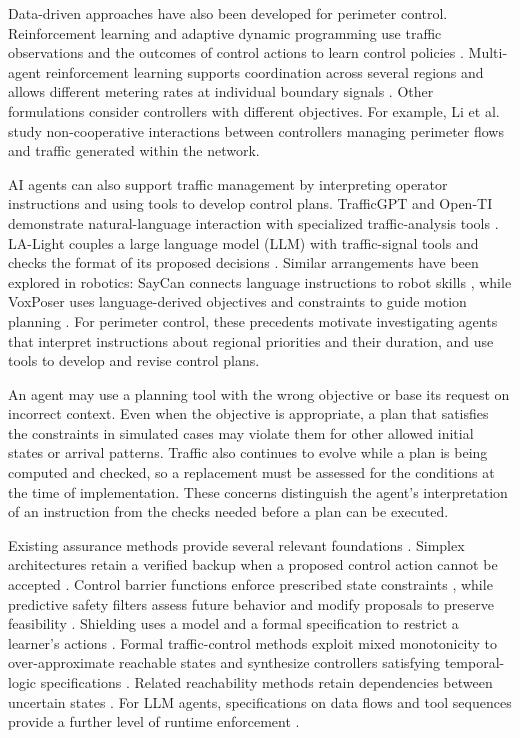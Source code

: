 \documentclass[preprint,12pt]{elsarticle}
\theoremstyle{definition}
\theoremstyle{plain}
\theoremstyle{definition}
\theoremstyle{plain}
\begin{document}
Data-driven approaches have also been developed for perimeter control.
Reinforcement learning and adaptive dynamic programming use traffic
observations and the outcomes of control actions to learn control policies
\cite{chen2022dataefficient,chen2024iadp}. Multi-agent reinforcement
learning supports coordination across several regions and allows
different metering rates at individual boundary signals
\cite{zhou2023scalable,yu2025physicsperimeter}. Other formulations consider
controllers with different objectives. For example, Li et al.\ \cite{li2024beyond}
study non-cooperative interactions between controllers managing perimeter
flows and traffic generated within the network.

AI agents can also support traffic management by interpreting operator
instructions and using tools to develop control plans. TrafficGPT and
Open-TI demonstrate natural-language interaction with specialized
traffic-analysis tools \cite{trafficgpt2024,openti2024}. LA-Light couples
a large language model (LLM) with traffic-signal tools and checks the format of its proposed
decisions \cite{wang2024lalight}. Similar arrangements have been explored in robotics: SayCan connects language
instructions to robot skills \cite{saycan2023}, while VoxPoser uses
language-derived objectives and constraints to guide motion planning
\cite{voxposer2023}. For perimeter control, these precedents motivate
investigating agents that interpret instructions about regional priorities
and their duration, and use tools to develop and revise control plans.

An agent may use a planning tool with the wrong objective or base its
request on incorrect context. Even when the objective is appropriate, a
plan that satisfies the constraints in simulated cases may violate them
for other allowed initial states or arrival patterns. Traffic also
continues to evolve while a plan is being computed and checked, so a
replacement must be assessed for the conditions at the time of
implementation. These concerns distinguish the agent's interpretation of
an instruction from the checks needed before a plan can be executed.

Existing assurance methods provide several relevant foundations
\cite{hobbs2023runtime}. Simplex architectures retain a verified backup
when a proposed control action cannot be accepted \cite{mehmood2022black}.
Control barrier functions enforce prescribed state constraints
\cite{ames2017}, while predictive safety filters assess future behavior
and modify proposals to preserve feasibility \cite{wabersich2021}.
Shielding uses a model and a formal specification to restrict a learner's
actions \cite{alshiekh2018}. Formal traffic-control methods exploit mixed
monotonicity to over-approximate reachable states and synthesize controllers
satisfying temporal-logic specifications \cite{coogan2017formal}.
Related reachability methods retain dependencies between uncertain states
\cite{coogan2020mixed,kochdumper2021sparse}. For LLM agents, specifications
on data flows and tool sequences provide a further level of runtime
enforcement \cite{doshi2026tools}.
\end{document}
